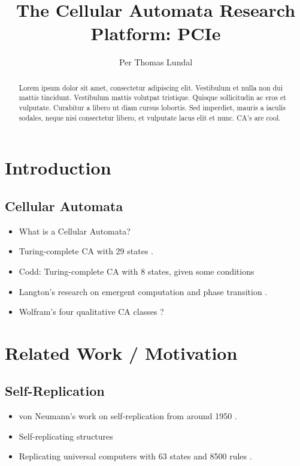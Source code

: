 \documentclass[a4paper]{IEEEtran}
\title{The Cellular Automata Research Platform: PCIe}
\author{Per Thomas Lundal}
\begin{document}
\maketitle

\begin{abstract}

Lorem ipsum dolor sit amet, consectetur adipiscing elit. Vestibulum et nulla non dui mattis tincidunt. Vestibulum mattis volutpat tristique. Quisque sollicitudin ac eros et vulputate. Curabitur a libero ut diam cursus lobortis. Sed imperdiet, mauris a iaculis sodales, neque nisi consectetur libero, et vulputate lacus elit et nunc. CA's are cool.

\end{abstract}

\section{Introduction}

\subsection{Cellular Automata}

\begin{itemize}
    \item What is a Cellular Automata?
    \item Turing-complete CA with 29 states \cite{neumann1966selfreplication}.
    \item Codd: Turing-complete CA with 8 states, given some conditions \cite{codd1968cellular}
    \item Langton's research on emergent computation and phase transition \cite{langton1990edgeofchaos}.
    \item Wolfram's four qualitative CA classes \cite{wolfram1984complexity}?
\end{itemize}

\section{Related Work / Motivation}

\subsection{Self-Replication}

\begin{itemize}
    \item von Neumann's work on self-replication from around 1950 \cite{neumann1966selfreplication}.
    \item Self-replicating structures \cite{reggia1998neumann}
    \item Replicating universal computers with 63 states and 8500 rules \cite{perrier1996toward}.
\end{itemize}
\end{document}
